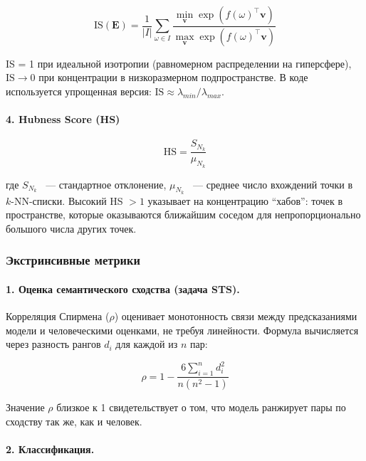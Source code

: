 \begin{displaymath}
  \text{IS}(\mathbf{E}) = \frac{1}{|I|} \sum_{\omega \in I}
  \frac{\min_{\mathbf{v}} \exp\!\left(f(\omega)^\top
  \mathbf{v}\right)}{\max_{\mathbf{v}} \exp\!\left(f(\omega)^\top
  \mathbf{v}\right)}
\end{displaymath}

IS = 1 при идеальной изотропии (равномерном распределении на
гиперсфере), \(\text{IS} \to
0\) при концентрации в низкоразмерном подпространстве. В коде используется
упрощенная версия: \(\text{IS} \approx \lambda_{min} / \lambda_{max}\).

\paragraph{4. Hubness Score (HS)}

\begin{displaymath}
  \text{HS} = \frac{S_{N_k}}{\mu_{N_k}}
\end{displaymath}

где \(S_{N_k}\) ~--- стандартное отклонение, \(\mu_{N_k}\) ~--- среднее число
вхождений точки в \(k\text{-NN-списки}\). Высокий HS \(> 1\) указывает на
концентрацию \enquote{хабов}: точек в пространстве, которые
оказываются ближайшим соседом для непропорционально большого числа
других точек.

\subsubsection{Экстринсивные метрики}

\paragraph{1. Оценка семантического сходства (задача STS).}

Корреляция Спирмена (\(\rho\)) оценивает монотонность
связи между предсказаниями модели и человеческими оценками, не требуя
линейности. Формула вычисляется через разность рангов \(d_i\) для
каждой из \(n\) пар:

\begin{displaymath}
  \rho = 1 - \frac{6\sum_{i=1}^{n} d_i^2}{n(n^2 - 1)}
\end{displaymath}

Значение \(\rho\) близкое к 1 свидетельствует о том, что модель
ранжирует пары по сходству так же, как и человек.

\paragraph{2. Классификация.}

